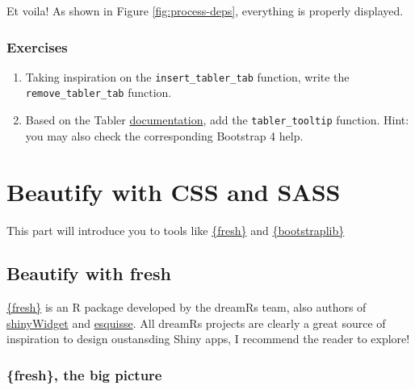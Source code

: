 \documentclass[
]{book}
\providecommand{\tightlist}{%
  \setlength{\itemsep}{0pt}\setlength{\parskip}{0pt}}
\begin{document}
Et voila! As shown in Figure \ref{fig:process-deps}, everything is properly displayed.

\hypertarget{exercises-2}{%
\section{Exercises}\label{exercises-2}}

\begin{enumerate}
\def\labelenumi{\arabic{enumi}.}
\tightlist
\item
  Taking inspiration on the \texttt{insert\_tabler\_tab} function, write the \texttt{remove\_tabler\_tab} function.
\item
  Based on the Tabler \href{https://preview-dev.tabler.io/docs/tooltips.html}{documentation}, add the \texttt{tabler\_tooltip} function. Hint: you may also check the corresponding Bootstrap 4 help.
\end{enumerate}

\hypertarget{part-beautify-with-css-and-sass}{%
\part*{Beautify with CSS and SASS}\label{part-beautify-with-css-and-sass}}

This part will introduce you to tools like \href{https://dreamrs.github.io/fresh/index.html}{\{fresh\}} and \href{https://rstudio.github.io/bootstraplib/index.html}{\{bootstraplib\}}

\hypertarget{beautify-with-fresh}{%
\chapter{Beautify with fresh}\label{beautify-with-fresh}}

\href{https://github.com/dreamRs/fresh}{\{fresh\}} is an R package developed by the dreamRs team, also authors of \href{https://github.com/dreamRs/shinyWidgets}{shinyWidget} and \href{https://github.com/dreamRs/esquisse}{esquisse}. All dreamRs projects are clearly a great source of inspiration to design oustansding Shiny apps, I recommend the reader to explore!

\hypertarget{fresh-the-big-picture}{%
\section{\{fresh\}, the big picture}\label{fresh-the-big-picture}}
\end{document}
